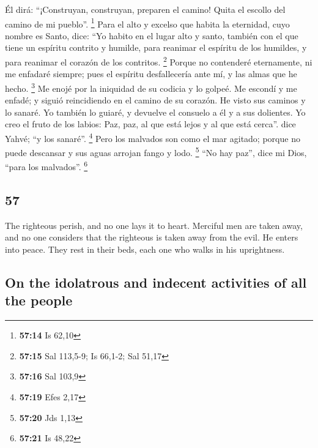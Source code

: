 \begin{paracol}{2}
 Él dirá: ``¡Construyan, construyan, preparen el camino!
Quita el escollo del camino de mi pueblo''. \footnote{\textbf{57:14} Is
  62,10}  Para el alto y excelso que habita la eternidad,
cuyo nombre es Santo, dice: ``Yo habito en el lugar alto y santo,
también con el que tiene un espíritu contrito y humilde, para reanimar
el espíritu de los humildes, y para reanimar el corazón de los
contritos. \footnote{\textbf{57:15} Sal 113,5-9; Is 66,1-2; Sal 51,17}
 Porque no contenderé eternamente, ni me enfadaré
siempre; pues el espíritu desfallecería ante mí, y las almas que he
hecho. \footnote{\textbf{57:16} Sal 103,9}  Me enojé por
la iniquidad de su codicia y lo golpeé. Me escondí y me enfadé; y siguió
reincidiendo en el camino de su corazón.  He visto sus
caminos y lo sanaré. Yo también lo guiaré, y devuelve el consuelo a él y
a sus dolientes.  Yo creo el fruto de los labios: Paz,
paz, al que está lejos y al que está cerca''. dice Yahvé; ``y los
sanaré''. \footnote{\textbf{57:19} Efes 2,17}  Pero los
malvados son como el mar agitado; porque no puede descansar y sus aguas
arrojan fango y lodo. \footnote{\textbf{57:20} Jds 1,13} 
``No hay paz'', dice mi Dios, ``para los malvados''. \footnote{\textbf{57:21}
  Is 48,22}

\switchcolumn
\begin{otherlanguage}{english}

\hypertarget{section-113}{%
\section{57}\label{section-113}}

 The righteous perish, and no one lays it to heart.
Merciful men are taken away, and no one considers that the righteous is
taken away from the evil.  He enters into peace. They rest
in their beds, each one who walks in his uprightness.

\hypertarget{on-the-idolatrous-and-indecent-activities-of-all-the-people}{%
\subsection{On the idolatrous and indecent activities of all the
people}\label{on-the-idolatrous-and-indecent-activities-of-all-the-people}}


\end{otherlanguage}
\end{paracol}
